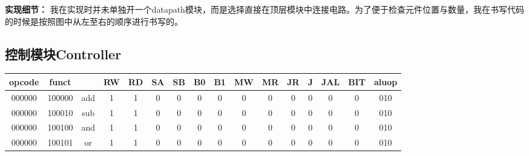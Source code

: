 \documentclass[twocolumn]{article} %
\begin{document}
\begin{sloppypar}
{\bf 实现细节：} 我在实现时并未单独开一个datapath模块，而是选择直接在顶层模块中连接电路。为了便于检查元件位置与数量，我在书写代码的时候是按照图中从左至右的顺序进行书写的。



\subsection{控制模块Controller}
\label{sec:controller}

\begin{table}[t]
\begin{tabular}{cccccccccccccccc}
\hline
\multicolumn{1}{c}{opcode} & \multicolumn{1}{c}{funct} & \multicolumn{1}{c}{} & \multicolumn{1}{c}{RW} & \multicolumn{1}{c}{RD} & \multicolumn{1}{c}{SA} & \multicolumn{1}{c}{SB} & \multicolumn{1}{c}{B0} & \multicolumn{1}{c}{B1} & \multicolumn{1}{c}{MW} & \multicolumn{1}{c}{MR} & \multicolumn{1}{c}{JR} & \multicolumn{1}{c}{J} & \multicolumn{1}{c}{JAL} & \multicolumn{1}{c}{BIT} & aluop \\ \hline
000000                      & 100000                     & add                   & 1                       & 1                       & 0                       & 0                       & 0                       & 0                       & 0                       & 0                       & 0                       & 0                      & 0                        & 0                        & 010   \\
000000                      & 100010                     & sub                   & 1                       & 1                       & 0                       & 0                       & 0                       & 0                       & 0                       & 0                       & 0                       & 0                      & 0                        & 0                        & 010   \\
000000                      & 100100                     & and                   & 1                       & 1                       & 0                       & 0                       & 0                       & 0                       & 0                       & 0                       & 0                       & 0                      & 0                        & 0                        & 010   \\
000000                      & 100101                     & or                    & 1                       & 1                       & 0                       & 0                       & 0                       & 0                       & 0                       & 0                       & 0                       & 0                      & 0                        & 0                        & 010   \\

\end{tabular}
\end{table}
\end{sloppypar}
\end{document}

